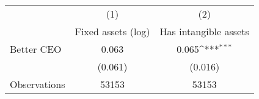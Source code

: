 {
\def\sym#1{\ifmmode^{#1}\else\(^{#1}\)\fi}
\begin{tabular}{l*{2}{c}}
\hline\hline
                    &\multicolumn{1}{c}{(1)}&\multicolumn{1}{c}{(2)}\\
                    &\multicolumn{1}{c}{Fixed assets (log)}&\multicolumn{1}{c}{Has intangible assets}\\
\hline
Better CEO          &       0.063         &       0.065\sym{***}\\
                    &     (0.061)         &     (0.016)         \\
\hline
Observations        &       53153         &       53153         \\
\hline\hline
\end{tabular}
}
